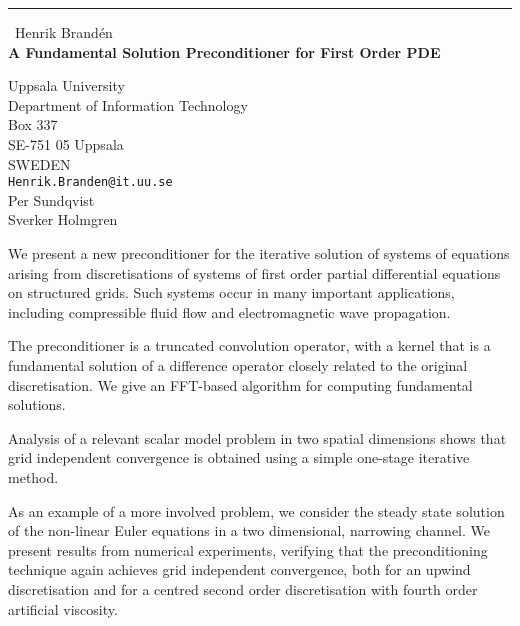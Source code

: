 \documentclass{report}
\begin{document}
\begin{center}
\rule{6in}{1pt} \
{\large Henrik Brand\'en \\
{\bf A Fundamental Solution Preconditioner for First Order PDE}}

Uppsala University \\ Department of Information Technology \\ Box 337 \\ SE-751 05  Uppsala \\ SWEDEN
\\
{\tt Henrik.Branden@it.uu.se}\\
Per Sundqvist\\
Sverker Holmgren\end{center}

We present a new preconditioner for the iterative solution of
systems of equations arising from discretisations of systems of
first order partial differential equations on structured grids.
Such systems occur in many important applications, including
compressible fluid flow and electromagnetic wave propagation.

The preconditioner is a truncated convolution operator, with a
kernel that is a fundamental solution of a difference operator
closely related to the original discretisation. We give an
FFT-based algorithm for computing fundamental solutions.

Analysis of a relevant scalar model problem in two spatial
dimensions shows that grid independent convergence is obtained
using a simple one-stage iterative method.

As an example of a more involved problem, we consider the steady
state solution of the non-linear Euler equations in a two
dimensional, narrowing channel. We present results from numerical
experiments, verifying that the preconditioning technique again
achieves grid independent convergence, both for an upwind
discretisation and for a centred second order discretisation with
fourth order artificial viscosity.
\end{document}
